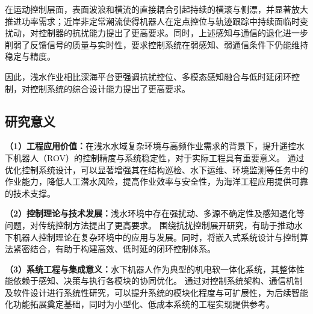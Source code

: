 在运动控制层面，表面波浪和横流的直接耦合引起持续的横滚与侧漂，并显著放大推进功率需求\cite{Zhao2024}；近岸非定常潮流使得机器人在定点控位与轨迹跟踪中持续面临时变扰动，对控制器的抗扰能力提出了更高要求\cite{sun2024underwater}。同时，上述感知与通信的退化进一步削弱了反馈信号的质量与实时性，要求控制系统在弱感知、弱通信条件下仍能维持稳定与精度。

因此，浅水作业相比深海平台更强调抗扰控位、多模态感知融合与低时延闭环控制，对控制系统的综合设计能力提出了更高要求。



\subsection{研究意义}

\noindent\textbf{（1）工程应用价值：}在浅水水域复杂环境与高频作业需求的背景下，提升遥控水下机器人（ROV）的控制精度与系统稳定性，对于实际工程具有重要意义。
通过优化控制系统设计，可以显著增强其在结构巡检、水下运维、环境监测等任务中的作业能力，降低人工潜水风险，提高作业效率与安全性，为海洋工程应用提供可靠的技术支撑。

\vspace{0.5em}
\noindent\textbf{（2）控制理论与技术发展：}浅水环境中存在强扰动、多源不确定性及感知退化等问题，对传统控制方法提出了更高要求。
围绕抗扰控制展开研究，有助于推动水下机器人控制理论在复杂环境中的应用与发展。同时，将嵌入式系统设计与控制算法紧密结合，有助于构建高效、低时延的闭环控制体系。

\vspace{0.5em}
\noindent\textbf{（3）系统工程与集成意义：}水下机器人作为典型的机电软一体化系统，其整体性能依赖于感知、决策与执行各模块的协同优化。
通过对控制系统架构、通信机制及软件设计进行系统性研究，可以提升系统的模块化程度与可扩展性，为后续智能化功能拓展奠定基础，同时为小型化、低成本系统的工程实现提供参考。

